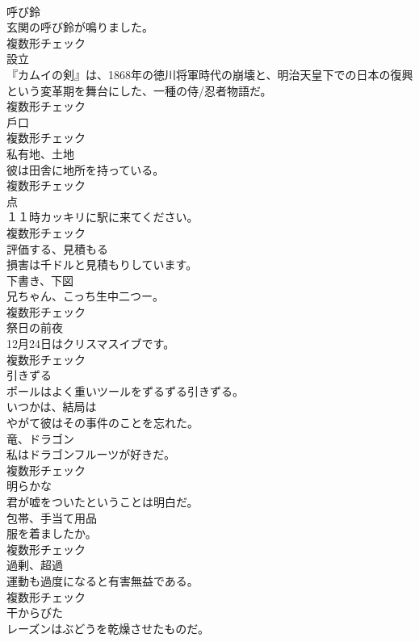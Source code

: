 \documentclass[8pt]{extreport}
\begin{document}
\begin{CJK}{UTF8}{min}
\\	[名詞]	呼び鈴	
\\	玄関の呼び鈴が鳴りました。	
\\	複数形チェック
\\	[名詞]	設立	
\\	『カムイの剣』は、1868年の徳川将軍時代の崩壊と、明治天皇下での日本の復興という変革期を舞台にした、一種の侍/忍者物語だ。	
\\	複数形チェック
\\	[名詞]	戶口	
\\	複数形チェック
\\	[名詞]	私有地、土地	
\\	彼は田舎に地所を持っている。	
\\	複数形チェック
\\	[名詞]	点	
\\	１１時カッキリに駅に来てください。	
\\	複数形チェック
\\	[動詞]	評価する、見積もる	
\\	損害は千ドルと見積もりしています。	
\\	[名詞]	下書き、下図	
\\	兄ちゃん、こっち生中二つー。	
\\	複数形チェック
\\	[名詞]	祭日の前夜	
\\	12月24日はクリスマスイブです。	
\\	複数形チェック
\\	[動詞]	引きずる	
\\	ポールはよく重いツールをずるずる引きずる。	
\\	[副詞]	いつかは、結局は	
\\	やがて彼はその事件のことを忘れた。	
\\	[名詞]	⻯、ドラゴン	
\\	私はドラゴンフルーツが好きだ。	
\\	複数形チェック
\\	[形容詞]	明らかな	
\\	君が嘘をついたということは明白だ。	
\\	[名詞]	包帯、手当て用品	
\\	服を着ましたか。	
\\	複数形チェック
\\	[名詞]	過剰、超過	
\\	運動も過度になると有害無益である。	
\\	複数形チェック
\\	[形容詞]	干からびた	
\\	レーズンはぶどうを乾燥させたものだ。	

\end{CJK}
\end{document}
